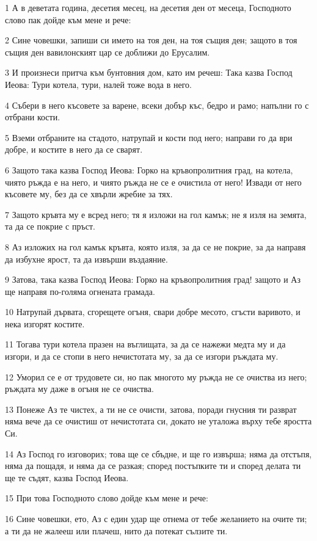 \par 1 А в деветата година, десетия месец, на десетия ден от месеца, Господното слово пак дойде към мене и рече:
\par 2 Сине човешки, запиши си името на тоя ден, на тоя същия ден; защото в тоя същия ден вавилонският цар се доближи до Ерусалим.
\par 3 И произнеси притча към бунтовния дом, като им речеш: Така казва Господ Иеова: Тури котела, тури, налей тоже вода в него.
\par 4 Събери в него късовете за варене, всеки добър къс, бедро и рамо; напълни го с отбрани кости.
\par 5 Вземи отбраните на стадото, натрупай и кости под него; направи го да ври добре, и костите в него да се сварят.
\par 6 Защото така казва Господ Иеова: Горко на кръвопролитния град, на котела, чиято ръжда е на него, и чиято ръжда не се е очистила от него! Извади от него късовете му, без да се хвърли жребие за тях.
\par 7 Защото кръвта му е всред него; тя я изложи на гол камък; не я изля на земята, та да се покрие с пръст.
\par 8 Аз изложих на гол камък кръвта, която изля, за да се не покрие, за да направя да избухне ярост, та да извърши въздаяние.
\par 9 Затова, така казва Господ Иеова: Горко на кръвопролитния град! защото и Аз ще направя по-голяма огнената грамада.
\par 10 Натрупай дървата, сгорещете огъня, свари добре месото, сгъсти варивото, и нека изгорят костите.
\par 11 Тогава тури котела празен на въглищата, за да се нажежи медта му и да изгори, и да се стопи в него нечистотата му, за да се изгори ръждата му.
\par 12 Уморил се е от трудовете си, но пак многото му ръжда не се очиства из него; ръждата му даже в огъня не се очиства.
\par 13 Понеже Аз те чистех, а ти не се очисти, затова, поради гнусния ти разврат няма вече да се очистиш от нечистотата си, докато не уталожа върху тебе яростта Си.
\par 14 Аз Господ го изговорих; това ще се сбъдне, и ще го извърша; няма да отстъпя, няма да пощадя, и няма да се разкая; според постъпките ти и според делата ти ще те съдят, казва Господ Иеова.
\par 15 При това Господното слово дойде към мене и рече:
\par 16 Сине човешки, ето, Аз с един удар ще отнема от тебе желанието на очите ти; а ти да не жалееш или плачеш, нито да потекат сълзите ти.
